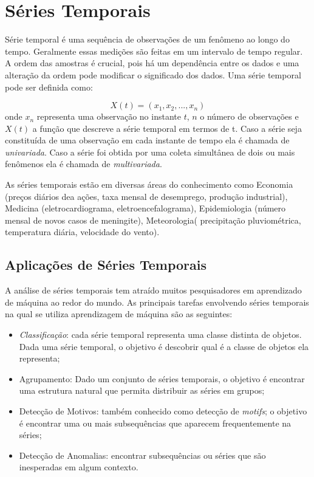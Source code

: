 \section{Séries Temporais}

Série temporal é uma sequência de observações de um fenômeno ao longo do tempo. Geralmente essas medições são feitas em um intervalo de tempo regular. A ordem das amostras é crucial, pois há um dependência entre os dados e uma alteração da ordem pode modificar o significado dos dados. Uma série temporal pode ser definida como:

\begin{equation} \label{eq_TS}
X(t) = (x_1,x_2,...,x_n)
\end{equation}
onde $x_n$ representa uma observação no instante $t$, $n$ o número de observações e $X(t)$ a função que descreve a série temporal em termos de t. Caso a série seja constituída de uma observação em cada instante de tempo ela é chamada de \textit{univariada}. Caso a série foi obtida por uma coleta simultânea de dois ou mais fenômenos ela é chamada de \textit{multivariada}.

As séries temporais estão em diversas áreas do conhecimento como Economia (preços diários dea ações, taxa mensal de desemprego, produção industrial), Medicina (eletrocardiograma, eletroencefalograma), Epidemiologia (número mensal de novos casos de meningite), Meteorologia( precipitação pluviométrica, temperatura diária, velocidade do vento).

\subsection{Aplicações de Séries Temporais}
A análise de séries temporais tem atraído muitos pesquisadores em aprendizado de máquina ao redor do mundo. As principais tarefas envolvendo séries temporais na qual se utiliza aprendizagem de máquina são as seguintes:

\begin{itemize}
	\item \textit{Classificação}: cada série temporal representa uma classe distinta de objetos. Dada uma série temporal, o objetivo é descobrir qual é a classe de objetos ela representa; 
	\item Agrupamento: Dado um conjunto de séries temporais, o objetivo é encontrar uma estrutura natural que permita distribuir as séries em grupos; 
	\item Detecção de Motivos: também conhecido como detecção de \textit{motifs}; o objetivo é encontrar uma ou mais subsequências que aparecem frequentemente na séries;
	\item Detecção de Anomalias: encontrar subsequências ou séries que são inesperadas em algum contexto.
\end{itemize}


